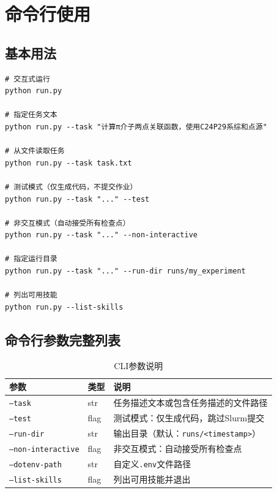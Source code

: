 \documentclass[12pt,a4paper]{ctexart}
\begin{document}
\section{命令行使用}

\subsection{基本用法}

\begin{lstlisting}[caption={LQCD Master 命令行接口}, label={lst:cli}]
# 交互式运行
python run.py

# 指定任务文本
python run.py --task "计算π介子两点关联函数，使用C24P29系综和点源"

# 从文件读取任务
python run.py --task task.txt

# 测试模式（仅生成代码，不提交作业）
python run.py --task "..." --test

# 非交互模式（自动接受所有检查点）
python run.py --task "..." --non-interactive

# 指定运行目录
python run.py --task "..." --run-dir runs/my_experiment

# 列出可用技能
python run.py --list-skills
\end{lstlisting}

\subsection{命令行参数完整列表}

\begin{table}[H]
\centering
\caption{CLI参数说明}
\label{tab:cli_args}
\begin{tabular}{@{}llp{6cm}@{}}
\toprule
\textbf{参数} & \textbf{类型} & \textbf{说明} \\
\midrule
\texttt{--task} & str & 任务描述文本或包含任务描述的文件路径 \\
\texttt{--test} & flag & 测试模式：仅生成代码，跳过Slurm提交 \\
\texttt{--run-dir} & str & 输出目录（默认：\texttt{runs/<timestamp>}） \\
\texttt{--non-interactive} & flag & 非交互模式：自动接受所有检查点 \\
\texttt{--dotenv-path} & str & 自定义\texttt{.env}文件路径 \\
\texttt{--list-skills} & flag & 列出可用技能并退出 \\
\bottomrule
\end{tabular}
\end{table}
\end{document}
